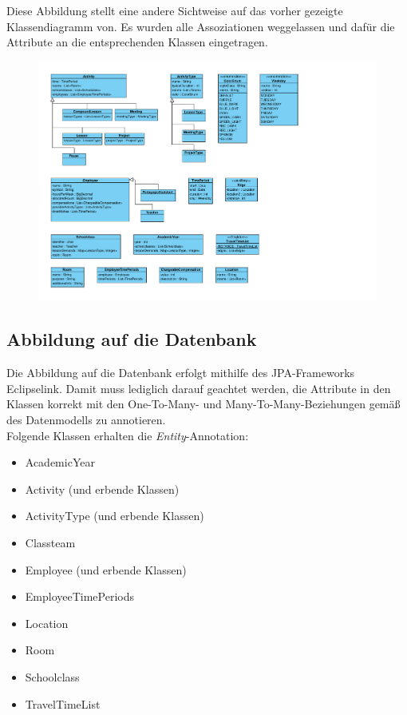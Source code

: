 \documentclass[fontsize=12pt,paper=a4,twoside]{scrartcl}
\begin{document}
Diese Abbildung stellt eine andere Sichtweise auf das vorher gezeigte Klassendiagramm von. Es wurden alle Assoziationen weggelassen und dafür die Attribute an die entsprechenden Klassen eingetragen.
\begin{figure}[H]
\includegraphics[width=\textwidth]{Datensicht.pdf}
\end{figure}


\subsection{Abbildung auf die Datenbank}
Die Abbildung auf die Datenbank erfolgt mithilfe des JPA-Frameworks Eclipselink. Damit muss lediglich darauf geachtet werden, die Attribute in den Klassen korrekt mit den One-To-Many- und Many-To-Many-Beziehungen gemäß des Datenmodells zu annotieren.\\

Folgende Klassen erhalten die \textit{Entity}-Annotation: 
\begin{itemize}
\item AcademicYear
\item Activity (und erbende Klassen)
\item ActivityType (und erbende Klassen)
\item Classteam
\item Employee (und erbende Klassen)
\item EmployeeTimePeriods
\item Location
\item Room
\item Schoolclass
\item TravelTimeList
\end{itemize}
\end{document}
